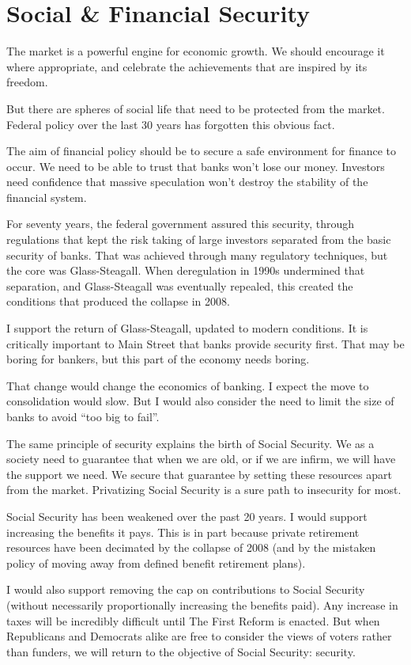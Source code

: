 
\section{Social \& Financial Security}
\label{sec:social--financial}

The market is a powerful engine for economic growth. 
We should encourage it where appropriate, and celebrate the achievements that are inspired by its freedom.

But there are spheres of social life that need to be protected from the market. 
Federal policy over the last 30 years has forgotten this obvious fact.

The aim of financial policy should be to secure a safe environment for finance to occur. 
We need to be able to trust that banks won't lose our money. 
Investors need confidence that massive speculation won't destroy the stability of the financial system.

For seventy years, the federal government assured this security, through regulations that kept the risk taking of large investors separated from the basic security of banks. 
That was achieved through many regulatory techniques, but the core was Glass-Steagall. 
When deregulation in 1990s undermined that separation, and Glass-Steagall was eventually repealed, this created the conditions that produced the collapse in 2008.

I support the return of Glass-Steagall, updated to modern conditions. 
It is critically important to Main Street that banks provide security first. 
That may be boring for bankers, but this part of the economy needs boring.

That change would change the economics of banking. 
I expect the move to consolidation would slow. 
But I would also consider the need to limit the size of banks to avoid ``too big to fail''.

The same principle of security explains the birth of Social Security. 
We as a society need to guarantee that when we are old, or if we are infirm, we will have the support we need. 
We secure that guarantee by setting these resources apart from the market. 
Privatizing Social Security is a sure path to insecurity for most.

Social Security has been weakened over the past 20 years. 
I would support increasing the benefits it pays. 
This is in part because private retirement resources have been decimated by the collapse of 2008 (and by the mistaken policy of moving away from defined benefit retirement plans).

I would also support removing the cap on contributions to Social Security (without necessarily proportionally increasing the benefits paid). 
Any increase in taxes will be incredibly difficult until The First Reform is enacted. 
But when Republicans and Democrats alike are free to consider the views of voters rather than funders, we will return to the objective of Social Security: security.
